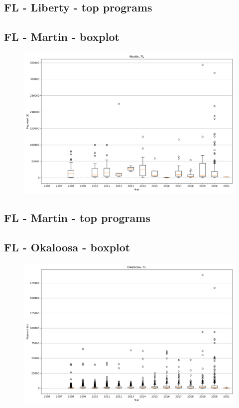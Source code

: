 \subsection*{FL - Liberty - top programs}

\newpage
\subsection*{FL - Martin - boxplot}
\begin{figure}[h]
\centering
\includegraphics[width=7in]{../output/boxplots/counties/Martin-FL_boxplot.png}
\end{figure}


\subsection*{FL - Martin - top programs}

\newpage
\subsection*{FL - Okaloosa - boxplot}
\begin{figure}[h]
\centering
\includegraphics[width=7in]{../output/boxplots/counties/Okaloosa-FL_boxplot.png}
\end{figure}


